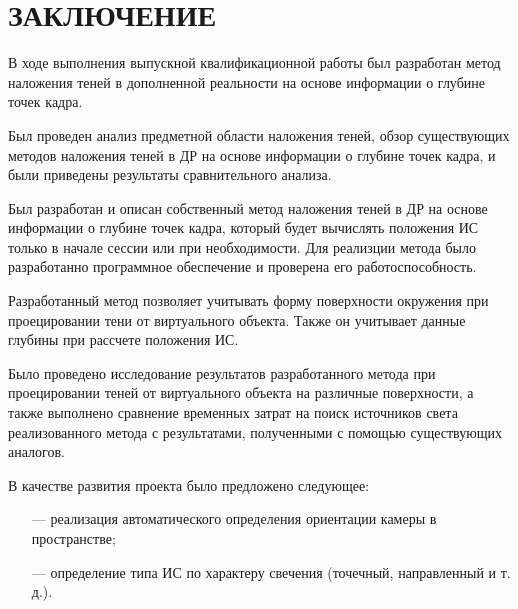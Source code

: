 \chapter*{ЗАКЛЮЧЕНИЕ}

В ходе выполнения выпускной квалификационной работы был разработан метод наложения теней в дополненной реальности на основе информации о глубине точек кадра.

Был проведен анализ предметной области наложения теней, обзор существующих методов наложения теней в ДР на основе информации о глубине точек кадра, и были приведены результаты сравнительного анализа.

Был разработан и описан собственный метод наложения теней в ДР на основе информации о глубине точек кадра, который будет вычислять положения ИС только в начале сессии или при необходимости. Для реализции метода было разработанно программное обеспечение и проверена его работоспособность.

Разработанный метод позволяет учитывать форму поверхности окружения при проецировании тени от виртуального объекта. Также он учитывает данные глубины при рассчете положения ИС.

Было проведено исследование результатов разработанного метода при проецировании теней от виртуального объекта на различные поверхности, а также выполнено сравнение временных затрат на поиск источников света реализованного метода с результатами, полученными с помощью существующих аналогов.

В качестве развития проекта было предложено следующее:

\begin{itemize}
	\item[---] реализация автоматического определения ориентации камеры в пространстве;
	\item[---] определение типа ИС по характеру свечения (точечный, направленный и т. д.).
\end{itemize}